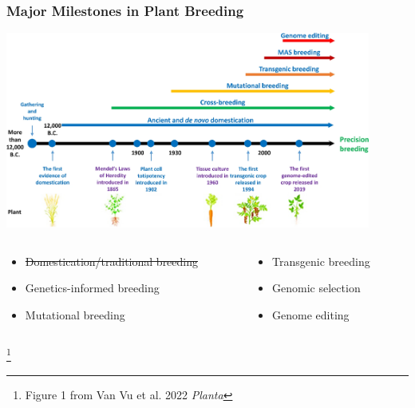 \documentclass[xcolor=dvipsnames]{beamer}
\newcommand\blfootnote[1]{%
	\begingroup
	\renewcommand\thefootnote{}\footnote{#1}%
	\addtocounter{footnote}{-1}%
	\endgroup
}
\begin{document}
\begin{frame}
	\frametitle{Major Milestones in Plant Breeding}
	\centering	\includegraphics[keepaspectratio, width  = 0.9\textwidth]{img/timeLine}
	
	
	\begin{columns}
		\begin{column}{0.5\textwidth}
			\begin{itemize}
				\item[\textbf{1}] \st{Domestication/traditional breeding}
				\item[\textbf{2}] Genetics-informed breeding
				\item[\textbf{3}] Mutational breeding
			\end{itemize}
		\end{column}
		\begin{column}{0.5\textwidth}
			\begin{itemize}
				\item[\textbf{4}] Transgenic breeding
				\item[\textbf{5}] Genomic selection
				\item[\textbf{6}] Genome editing
			\end{itemize}
		\end{column}
	\end{columns}
	
	\blfootnote{Figure 1 from Van Vu et al. 2022 \textit{Planta}}
	
	
	
\end{frame}
\end{document}

